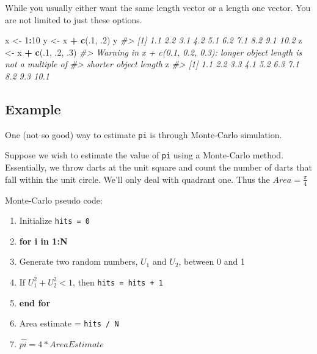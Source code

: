 \documentclass[]{book}
\newenvironment{Shaded}{\begin{snugshade}}{\end{snugshade}}
\newcommand{\KeywordTok}[1]{\textcolor[rgb]{0.13,0.29,0.53}{\textbf{#1}}}
\newcommand{\DecValTok}[1]{\textcolor[rgb]{0.00,0.00,0.81}{#1}}
\newcommand{\StringTok}[1]{\textcolor[rgb]{0.31,0.60,0.02}{#1}}
\newcommand{\CommentTok}[1]{\textcolor[rgb]{0.56,0.35,0.01}{\textit{#1}}}
\newcommand{\OperatorTok}[1]{\textcolor[rgb]{0.81,0.36,0.00}{\textbf{#1}}}
\newcommand{\NormalTok}[1]{#1}
\providecommand{\tightlist}{%
  \setlength{\itemsep}{0pt}\setlength{\parskip}{0pt}}
\begin{document}
While you usually either want the same length vector or a length one
vector. You are not limited to just these options.

\begin{Shaded}
\begin{Highlighting}[]
\NormalTok{x <-}\StringTok{ }\DecValTok{1}\OperatorTok{:}\DecValTok{10}
\NormalTok{y <-}\StringTok{ }\NormalTok{x }\OperatorTok{+}\StringTok{ }\KeywordTok{c}\NormalTok{(.}\DecValTok{1}\NormalTok{, .}\DecValTok{2}\NormalTok{) }
\NormalTok{y}
\CommentTok{#>  [1]  1.1  2.2  3.1  4.2  5.1  6.2  7.1  8.2  9.1 10.2}
\NormalTok{z <-}\StringTok{ }\NormalTok{x }\OperatorTok{+}\StringTok{ }\KeywordTok{c}\NormalTok{(.}\DecValTok{1}\NormalTok{, .}\DecValTok{2}\NormalTok{, .}\DecValTok{3}\NormalTok{)}
\CommentTok{#> Warning in x + c(0.1, 0.2, 0.3): longer object length is not a multiple of}
\CommentTok{#> shorter object length}
\NormalTok{z}
\CommentTok{#>  [1]  1.1  2.2  3.3  4.1  5.2  6.3  7.1  8.2  9.3 10.1}
\end{Highlighting}
\end{Shaded}

\subsection{Example}\label{example}

One (not so good) way to estimate \texttt{pi} is through Monte-Carlo
simulation.

Suppose we wish to estimate the value of \texttt{pi} using a Monte-Carlo
method. Essentially, we throw darts at the unit square and count the
number of darts that fall within the unit circle. We'll only deal with
quadrant one. Thus the \(Area = \frac{\pi}{4}\)

Monte-Carlo pseudo code:

\begin{enumerate}
\def\labelenumi{\arabic{enumi}.}
\tightlist
\item
  Initialize \texttt{hits\ =\ 0}
\item
  \textbf{for i in 1:N}
\item
  Generate two random numbers, \(U_1\) and \(U_2\), between 0 and 1
\item
  If \(U_1^2 + U_2^2 < 1\), then \texttt{hits\ =\ hits\ +\ 1}
\item
  \textbf{end for}
\item
  Area estimate = \texttt{hits\ /\ N}
\item
  \(\hat{pi} = 4 * Area Estimate\)
\end{enumerate}
\end{document}
